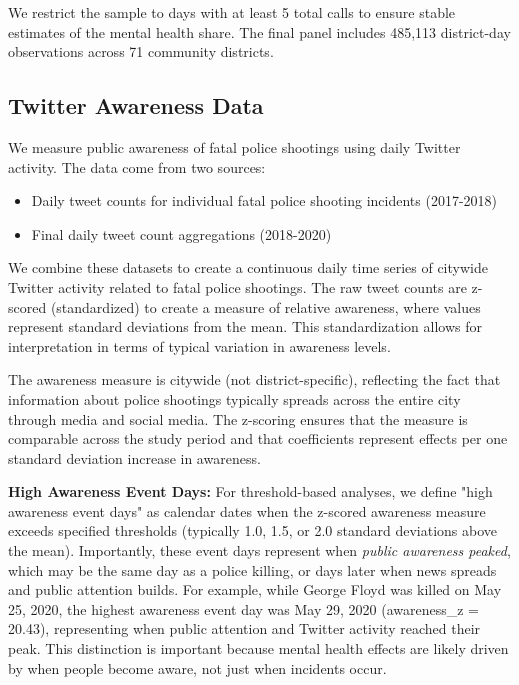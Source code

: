 \documentclass[11pt,a4paper]{article}
\begin{document}
We restrict the sample to days with at least 5 total calls to ensure stable estimates of the mental health share. The final panel includes 485,113 district-day observations across 71 community districts.

\subsection{Twitter Awareness Data}

We measure public awareness of fatal police shootings using daily Twitter activity. The data come from two sources:
\begin{itemize}
    \item Daily tweet counts for individual fatal police shooting incidents (2017-2018)
    \item Final daily tweet count aggregations (2018-2020)
\end{itemize}

We combine these datasets to create a continuous daily time series of citywide Twitter activity related to fatal police shootings. The raw tweet counts are z-scored (standardized) to create a measure of relative awareness, where values represent standard deviations from the mean. This standardization allows for interpretation in terms of typical variation in awareness levels.

The awareness measure is citywide (not district-specific), reflecting the fact that information about police shootings typically spreads across the entire city through media and social media. The z-scoring ensures that the measure is comparable across the study period and that coefficients represent effects per one standard deviation increase in awareness.

\textbf{High Awareness Event Days:} For threshold-based analyses, we define "high awareness event days" as calendar dates when the z-scored awareness measure exceeds specified thresholds (typically 1.0, 1.5, or 2.0 standard deviations above the mean). Importantly, these event days represent when \textit{public awareness peaked}, which may be the same day as a police killing, or days later when news spreads and public attention builds. For example, while George Floyd was killed on May 25, 2020, the highest awareness event day was May 29, 2020 (awareness_z = 20.43), representing when public attention and Twitter activity reached their peak. This distinction is important because mental health effects are likely driven by when people become aware, not just when incidents occur.
\end{document}
